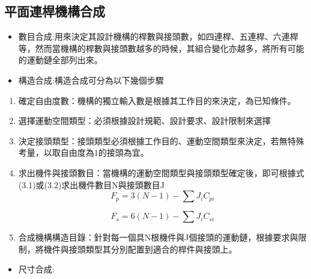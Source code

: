 \documentclass[14pt,a4paper]{report}  %
\newcommand{\fourteen}{\fontsize{14pt}{\baselineskip}\selectfont}%
\begin{document}
      \fourteen{Cython是結合了Python和C語法的一種語言，使用者可以維持大部分的Python語法，而不需要大幅度調整主要的程式邏輯與演算法。}
      
      
      \subsection{平面連桿機構合成}
      \fourteen{進行機構設計與合成主要流程分為數目合成、構造合成、尺寸合成與運動學模擬，合成皆有其順序性存在，而運動學模擬則是進行分析前面的合成項目。}
      \begin{itemize} 
      \item 數目合成:用來決定其設計機構的桿數與接頭數，如四連桿、五連桿、六連桿等，然而當機構的桿數與接頭數越多的時候，其組合變化亦越多，將所有可能的運動鏈全部列出來。
      \item 構造合成:構造合成可分為以下幾個步驟
      \end{itemize} 
      \begin{enumerate}
      \item 確定自由度數：機構的獨立輸入數是根據其工作目的來決定，為已知條件。
      \item 選擇運動空間類型：必須根據設計規範、設計要求、設計限制來選擇
      \item 決定接頭類型：接頭類型必須根據工作目的、運動空間類型來決定，若無特殊考量，以取自由度為1的接頭為宜。
      \item 求出機件與接頭數目：當機構的運動空間類型與接頭類型確定後，即可根據式(3.1)或(3.2)求出機件數目N與接頭數目J
      \hspace*{\fill} \\
      
      \begin{equation}
      F_{p}=3\left ( N-1 \right )-\sum J_{i}C_{pi}
      \end{equation}  
      
      \begin{equation}
      F_{s}=6\left ( N-1 \right )-\sum J_{i}C_{si}
      \end{equation}  
      \item 合成機構構造目錄：針對每一個具N根機件與J個接頭的運動鏈，根據要求與限制，將機件與接頭類型其分別配置到適合的桿件與接頭上。
      \hspace*{\fill} \\
      \end{enumerate}
      \begin{itemize} 
      \item 尺寸合成:
      \end{itemize} 
\end{document}
